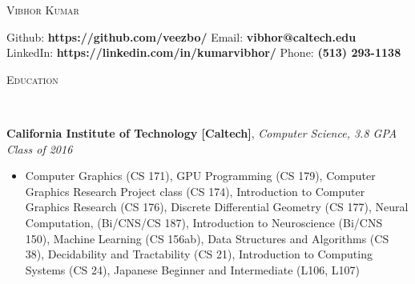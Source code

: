 \documentclass[9pt]{article}
\newenvironment{changemargin}[2]{%
  \begin{list}{}{%
    \setlength{\topsep}{0pt}%
    \setlength{\leftmargin}{#1}%
    \setlength{\rightmargin}{#2}%
    \setlength{\listparindent}{\parindent}%
    \setlength{\itemindent}{\parindent}%
    \setlength{\parsep}{\parskip}%
  }%
  \item[]}{\end{list}
}
\newcommand{\lineover}{
	\begin{changemargin}{-0.05in}{-0.05in}
		\vspace*{-8pt}
		\hrulefill \\
		\vspace*{-2pt}
	\end{changemargin}
}
\newcommand{\header}[1]{
	\begin{changemargin}{-0.5in}{-0.5in}
		\scshape{#1}\\
  	\lineover
	\end{changemargin}
}
\newenvironment{body} {
	\vspace*{-16pt}
	\begin{changemargin}{-0.25in}{-0.5in}
  }	
	{\end{changemargin}
}
\begin{document}
\begin{center} 
	{\Large \scshape Vibhor Kumar} 
\end{center}
	\vspace*{-2pt}
\hspace{-12mm} Github: \hspace{3mm} \textbf{https://github.com/veezbo/}
\hspace{46mm} Email: \hspace{0.1mm} \textbf{vibhor@caltech.edu} \\
\vspace*{1pt}
\hspace{-12mm} LinkedIn: \hspace{0.25mm} \textbf{https://linkedin.com/in/kumarvibhor/} \hspace{26.75mm} Phone: \textbf{(513) 293-1138}\\
\vspace{1pt}
\smallskip
\header{Education}
\begin{body}
	\vspace{15pt}
	\textbf{California Institute of Technology [Caltech]}{}, \emph{Computer Science, 3.8 GPA} \hfill \emph{Class of 2016}{} \\
	\begin{itemize} \itemsep -0pt
	\item Computer Graphics (CS 171), GPU Programming (CS 179), Computer Graphics Research Project class (CS 174), Introduction to Computer Graphics Research (CS 176), Discrete Differential Geometry (CS 177), Neural Computation, (Bi/CNS/CS 187), Introduction to Neuroscience (Bi/CNS 150), Machine Learning (CS 156ab), Data Structures and Algorithms (CS 38), Decidability and Tractability (CS 21), Introduction to Computing Systems (CS 24), Japanese Beginner and Intermediate (L106, L107)
	\end{itemize}
\end{body}

\smallskip
\vspace*{-3pt}
\end{document}
